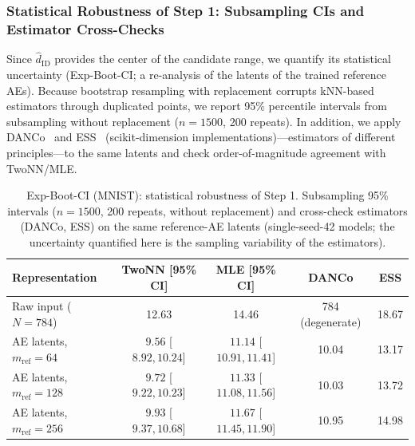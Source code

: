 \documentclass[make,article,submit,pdftex,moreauthors]{Definitions/mdpi}
\newcommand{\hatdID}{\hat{d}_{\mathrm{ID}}}
\begin{document}
\subsubsection{Statistical Robustness of Step 1: Subsampling CIs and Estimator Cross-Checks}
\label{sec:exp_mnist_ci}

Since $\hatdID$ provides the center of the candidate range, we quantify its
statistical uncertainty (Exp-Boot-CI; a re-analysis of the latents of the
trained reference AEs).
Because bootstrap resampling with replacement corrupts kNN-based estimators
through duplicated points, we report 95\% percentile intervals from
subsampling without replacement ($n = 1500$, 200 repeats).
In addition, we apply DANCo~\cite{ceruti2014danco} and
ESS~\cite{johnsson2015ess} (scikit-dimension implementations)---estimators
of different principles---to the same latents and check order-of-magnitude
agreement with TwoNN/MLE.

\begin{table}[H]
\caption{Exp-Boot-CI (MNIST): statistical robustness of Step 1.
Subsampling 95\% intervals ($n = 1500$, 200 repeats, without replacement)
and cross-check estimators (DANCo, ESS) on the same reference-AE latents
(single-seed-42 models; the uncertainty quantified here is the sampling
variability of the estimators).}
\label{tab:boot_ci}
\small
\begin{tabular}{lcccc}
\toprule
\textbf{Representation} & \textbf{TwoNN [95\% CI]} & \textbf{MLE [95\% CI]} & \textbf{DANCo} & \textbf{ESS} \\
\midrule
Raw input ($N = 784$) & 12.63 & 14.46 & 784 (degenerate) & 18.67 \\
\midrule
AE latents, $m_{\mathrm{ref}} = 64$  & $9.56$ [$8.92, 10.24$] & $11.14$ [$10.91, 11.41$] & 10.04 & 13.17 \\
AE latents, $m_{\mathrm{ref}} = 128$ & $9.72$ [$9.22, 10.23$] & $11.33$ [$11.08, 11.56$] & 10.03 & 13.72 \\
AE latents, $m_{\mathrm{ref}} = 256$ & $9.93$ [$9.37, 10.68$] & $11.67$ [$11.45, 11.90$] & 10.95 & 14.98 \\
\bottomrule
\end{tabular}
\end{table}
\end{document}
